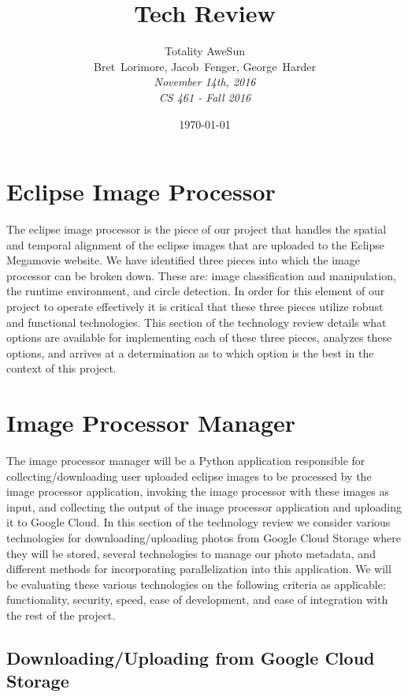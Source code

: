 \documentclass[10pt, onecolumn, draftclsnofoot, letterpaper, compsoc]{IEEEtran}
\title{Tech Review}
\date{\today} %
\author{Totality AweSun \\
		Bret~Lorimore, Jacob~Fenger, George~Harder \\
		\textit{November 14th, 2016 \\
		CS 461 - Fall 2016}}
\begin{document}

\maketitle

\section{Eclipse Image Processor}

The eclipse image processor is the piece of our project that handles the spatial
and temporal alignment of the eclipse images that are uploaded to the Eclipse
Megamovie website. We have identified three pieces\cite{imgKrista} into which
the image processor can be broken down. These are: image classification and
manipulation, the runtime environment, and circle detection. In order for this
element of our project to operate effectively it is critical that these three
pieces utilize robust and functional technologies. This section of the
technology review details what options are available for implementing each of
these three pieces, analyzes these options, and arrives at a determination as to
which option is the best in the context of this project.

\section{Image Processor Manager}

The image processor manager will be a Python application responsible for  
collecting/downloading user uploaded eclipse images to be processed by the image
processor application, invoking the image processor with these images as input,
and collecting the output of the image processor application and uploading it
to Google Cloud. In this section of the technology review we consider various
technologies for downloading/uploading photos from Google Cloud Storage where
they will be stored, several technologies to manage our photo metadata, and
different methods for incorporating parallelization into this application. We will
be evaluating these various technologies on the following criteria as applicable:
functionality, security, speed, ease of development, and ease of integration with
the rest of the project.

\subsection{Downloading/Uploading from Google Cloud Storage}
\end{document}

